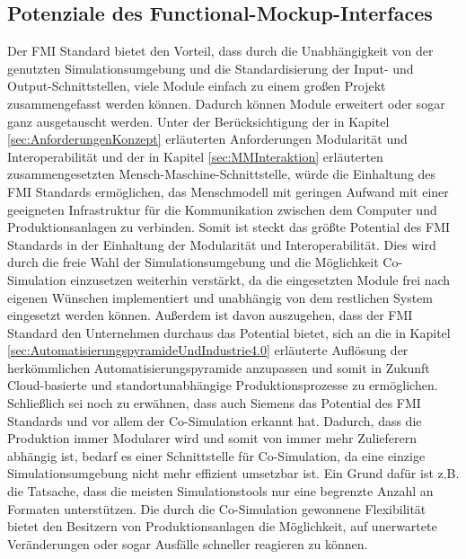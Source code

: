 \subsection{Potenziale des Functional-Mockup-Interfaces}\label{sec:PotenzialeFMU}
Der FMI Standard bietet den Vorteil, dass durch die Unabhängigkeit von der genutzten Simulationsumgebung und die Standardisierung der Input- und Output-Schnittstellen, viele Module einfach zu einem großen Projekt zusammengefasst werden können. Dadurch können Module erweitert oder sogar ganz ausgetauscht werden.
Unter der Berücksichtigung der in Kapitel \ref{sec:AnforderungenKonzept} erläuterten Anforderungen Modularität und Interoperabilität und der in Kapitel \ref{sec:MMInteraktion} erläuterten zusammengesetzten Mensch-Maschine-Schnittstelle, würde die Einhaltung des FMI Standards ermöglichen, das Menschmodell mit geringen Aufwand mit einer geeigneten Infrastruktur für die Kommunikation zwischen dem Computer und Produktionsanlagen zu verbinden.
\newline
Somit ist steckt das größte Potential des FMI Standards in der Einhaltung der Modularität und Interoperabilität. Dies wird durch die freie Wahl der Simulationsumgebung und die Möglichkeit Co-Simulation einzusetzen weiterhin verstärkt, da die eingesetzten Module frei nach eigenen Wünschen implementiert und unabhängig von dem restlichen System eingesetzt werden können. Außerdem ist davon auszugehen, dass der FMI Standard den Unternehmen durchaus das Potential bietet, sich an die in Kapitel \ref{sec:AutomatisierungspyramideUndIndustrie4.0} erläuterte Auflösung der herkömmlichen Automatisierungspyramide anzupassen und somit in Zukunft Cloud-basierte und standortunabhängige Produktionsprozesse zu ermöglichen.
\newline
Schließlich sei noch zu erwähnen, dass auch Siemens das Potential des FMI Standards und vor allem der Co-Simulation erkannt hat. Dadurch, dass die Produktion immer Modularer wird und somit von immer mehr Zulieferern abhängig ist, bedarf es einer Schnittstelle für Co-Simulation, da eine einzige Simulationsumgebung nicht mehr effizient umsetzbar ist. Ein Grund dafür ist z.B. die Tatsache, dass die meisten Simulationstools nur eine begrenzte Anzahl an Formaten unterstützen. Die durch die Co-Simulation gewonnene Flexibilität bietet den Besitzern von Produktionsanlagen die Möglichkeit, auf unerwartete Veränderungen oder sogar Ausfälle schneller reagieren zu können\cite[S.13]{27}. 

